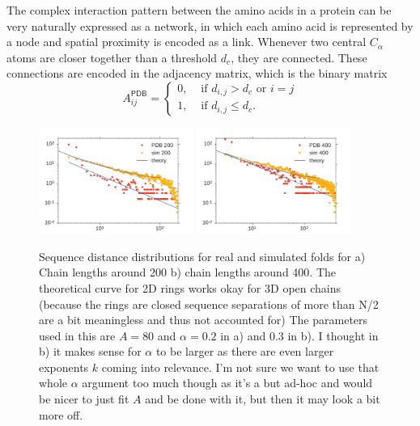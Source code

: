 \documentclass[reprint,amsmath,amssymb,rmp,onecolumn,notitlepage,11pt]{revtex4-1}
\begin{document}
The complex interaction pattern between the amino acids in a protein can be very naturally expressed as a network, in which each amino acid is represented by a node and spatial proximity is encoded as a link. Whenever two central $C_\alpha$ atoms are closer together than a threshold $d_c$, they are connected. These connections are encoded in the adjacency matrix, which is the binary matrix
\begin{equation}
  A^{\textsf{PDB}}_{ij}=
  \begin{cases}
   0, & \text{ if } d_{i,j}>d_c \text{ or } i=j\\
      1, & \text{ if } d_{i,j}\leq d_c .
      \end{cases}
    \label{eq:aij}
\end{equation}
  
\begin{figure}[h]
        \centering
	\includegraphics[width=0.45\textwidth]{figures/idp_200.pdf}
	\includegraphics[width=0.45\textwidth]{figures/idp_400.pdf}
        \caption{Sequence distance distributions for real and simulated folds for a) Chain lengths around 200 b) chain lengths around 400. The theoretical curve for 2D rings works okay for 3D open chains (because the rings are closed sequence separations of more than N/2 are a bit meaningless and thus not accounted for) The parameters used in this are $A=80$ and $\alpha=0.2$ in a) and $0.3$ in b). I thought in b) it makes sense for $\alpha$ to be larger as there are even larger exponents $k$ coming into relevance. I'm not sure we want to use that whole $\alpha$ argument too much though as it's a but ad-hoc and would be nicer to just fit $A$ and be done with it, but then it may look a bit more off.
        }
        \label{fig:time_scaling}
\end{figure}
\end{document}

